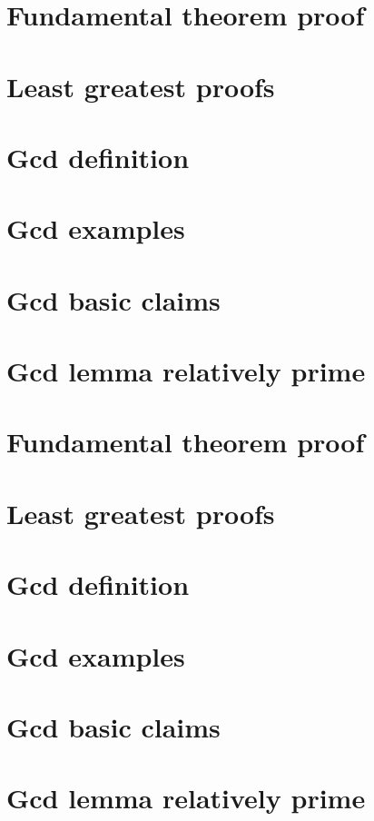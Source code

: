 
\section*{Fundamental theorem proof}

\vfill
\section*{Least greatest proofs}

\vfill
\section*{Gcd definition}

\vfill
\section*{Gcd examples}

\vfill
\section*{Gcd basic claims}

\vfill
\section*{Gcd lemma relatively prime}

\vfill
\section*{Fundamental theorem proof}

\vfill
\section*{Least greatest proofs}

\vfill
\section*{Gcd definition}

\vfill
\section*{Gcd examples}

\vfill
\section*{Gcd basic claims}

\vfill
\section*{Gcd lemma relatively prime}

\vfill

